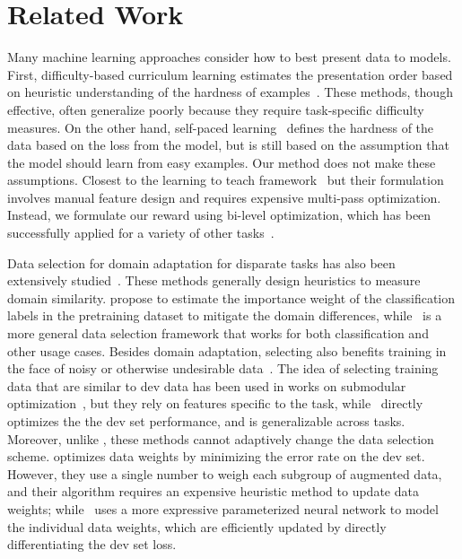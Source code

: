 \section{\label{sec:related_work}Related Work}
Many machine learning approaches consider how to best present data to models. First, difficulty-based curriculum learning estimates the presentation order based on heuristic understanding of the hardness of examples~\citep{cl_bengio,SpitkovskyAJ10,baysian_curriculum,zhang2016boosting,automate_cl_GravesBMMK17,zhang2018empirical,platanios19naacl}. These methods, though effective, often generalize poorly because they require task-specific difficulty measures. On the other hand, self-paced learning~\citep{spl_kumar,spl_visual_category} defines the hardness of the data based on the loss from the model, but is still based on the assumption that the model should learn from easy examples. Our method does not make these assumptions. Closest to the learning to teach framework~\citep{learn_to_teach} but their formulation involves manual feature design and requires expensive multi-pass optimization. Instead, we formulate our reward using bi-level optimization, which has been successfully applied for a variety of other tasks~\citep{bilevel_optim,hier_optim,darts,hyper_grad,learn_reweight}.

Data selection for domain adaptation for disparate tasks has also been extensively studied~\citep{moore2010intelligent,axelrod2011domain,domain_adapt_transfer,jiang-zhai-2007-instance,foster-etal-2010-discriminative,wang-etal-2017-instance}. These methods generally design heuristics to measure domain similarity.
\cite{domain_adapt_transfer} propose to estimate the importance weight of the classification labels in the pretraining dataset to mitigate the domain differences, while \dds~is a more general data selection framework that works for both classification and other usage cases.
Besides domain adaptation, selecting also benefits training in the face of noisy or otherwise undesirable data~\citep{vyas-etal-2018-identifying,pham-etal-2018-fixing}. The idea of selecting training data that are similar to dev data has been used in works on submodular optimization~\citep{submodular_mt,learn_mix_submodular}, but they rely on features specific to the task, while \dds~directly optimizes the the dev set performance, and is generalizable across tasks. Moreover, unlike \dds, these methods cannot adaptively change the data selection scheme. \cite{importance_weight} optimizes data weights by minimizing the error rate on the dev set. However, they use a single number to weigh each subgroup of augmented data, and their algorithm requires an expensive heuristic method to update data weights; while \dds~uses a more expressive parameterized neural network to model the individual data weights, which are efficiently updated by directly differentiating the dev set loss.



